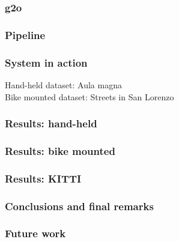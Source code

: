 \documentclass[11pt]{beamer}
\begin{document}
\begin{frame}
\frametitle{g2o}
\end{frame}

\begin{frame}
\frametitle{Pipeline}
\end{frame}

\begin{frame}
\frametitle{System in action}
Hand-held dataset: Aula magna\\
Bike mounted dataset: Streets in San Lorenzo
\end{frame}

\begin{frame}
\frametitle{Results: hand-held}
\end{frame}

\begin{frame}
\frametitle{Results: bike mounted}
\end{frame}

\begin{frame}
\frametitle{Results: KITTI}
\end{frame}

\begin{frame}
\frametitle{Conclusions and final remarks}
\end{frame}

\begin{frame}
\frametitle{Future work}
\end{frame}
\end{document}
